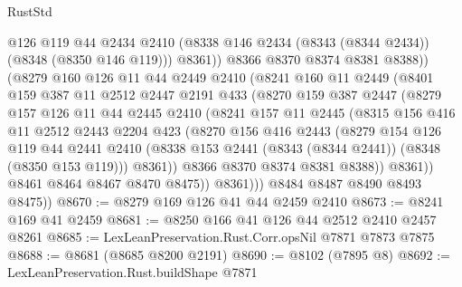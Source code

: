 \begin{lexlean}{RustStd}
\begin{coremodule}
{\begin{coremodule}
{{{{{{{{{{{{{{{{{{{{{{{{{{{{{{{{{{{{{{{{{{{{{{{{{{                    @126
                    @119
                    @44
                    @2434
                    @2410
                    (@8338 @146 @2434 (@8343 (@8344 @2434)) (@8348 (@8350 @146 @119)))
                    @8361))
                @8366
                @8370
                @8374
                @8381
                @8388))
            (@8279
              @160
              @126
              @11
              @44
              @2449
              @2410
              (@8241
                @160
                @11
                @2449
                (@8401
                  @159
                  @387
                  @11
                  @2512
                  @2447
                  @2191
                  @433
                  (@8270
                    @159
                    @387
                    @2447
                    (@8279
                      @157
                      @126
                      @11
                      @44
                      @2445
                      @2410
                      (@8241
                        @157
                        @11
                        @2445
                        (@8315
                          @156
                          @416
                          @11
                          @2512
                          @2443
                          @2204
                          @423
                          (@8270
                            @156
                            @416
                            @2443
                            (@8279
                              @154
                              @126
                              @119
                              @44
                              @2441
                              @2410
                              (@8338 @153 @2441 (@8343 (@8344 @2441)) (@8348 (@8350 @153 @119)))
                              @8361))
                          @8366
                          @8370
                          @8374
                          @8381
                          @8388))
                      @8361))
                  @8461
                  @8464
                  @8467
                  @8470
                  @8475))
              @8361)))
        @8484
        @8487
        @8490
        @8493
        @8475))
@8670 := @8279 @169 @126 @41 @44 @2459 @2410
@8673 := @8241 @169 @41 @2459
@8681 := @8250 @166 @41 @126 @44 @2512 @2410 @2457 @8261
@8685 := LexLeanPreservation.Rust.Corr.opsNil @7871 @7873 @7875
@8688 := @8681 (@8685 @8200 @2191)
@8690 := @8102 (@7895 @8)
@8692 := LexLeanPreservation.Rust.buildShape @7871
}}}}}}}}}}}}}}}}}}}}}}}}}}}}}}}}}}}}}}}}}}}}}}}}}}
\end{coremodule}}
\end{coremodule}
\end{lexlean}
